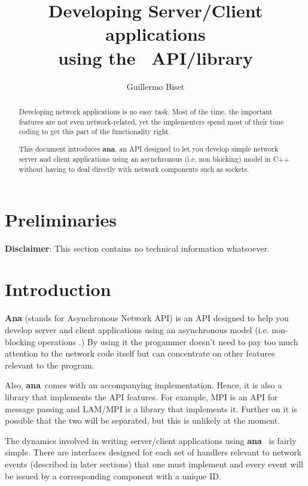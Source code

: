 \documentclass[a4paper,12pt,english]{article}
\title{Developing Server/Client applications \\
using the \ana \ API/library}
\author{Guillermo Biset}
\newcommand{\ana}{\textbf{ana}}
\begin{document}
\maketitle

\vfill

\begin{abstract}
Developing network applications is no easy task. Most of the time, the
important features are not  even network-related, yet the implementers
spend most of their time coding  to get this part of the functionality
right.

This  document introduces  \ana, an  API designed  to let  you develop
simple network  server and  client applications using  an asynchronous
(i.e. non blocking) model in  C++ without having to deal directly with
network components such as sockets.

\end{abstract}

\newpage

\tableofcontents

\newpage

\section{Preliminaries}

\textbf{Disclaimer}: This section contains no technical information
whatsoever.

\section{Introduction}

\textbf{Ana} (stands for Asynchronous  Network API) is an API designed
to  help   you  develop  server  and  client   applications  using  an
asynchronous model  (i.e.  non-blocking operations .) By  using it the
progammer doesn't need  to pay too much attention  to the network code
itself but can concentrate on other features relevant to the program.

Also, \ana \ comes with  an accompanying implementation.  Hence, it is
also a library that implements  the API features.  For example, MPI is
an API  for message passing and  LAM/MPI is a  library that implements
it. Further on it is possible that the two will be separated, but this
is unlikely at the moment.

The dynamics involved in writing server/client applications using \ana
\ is  fairly simple.   There are interfaces  designed for each  set of
handlers relevant to network events (described in later sections) that
one must implement  and every event will be  issued by a corresponding
component with a unique ID.
\end{document}
